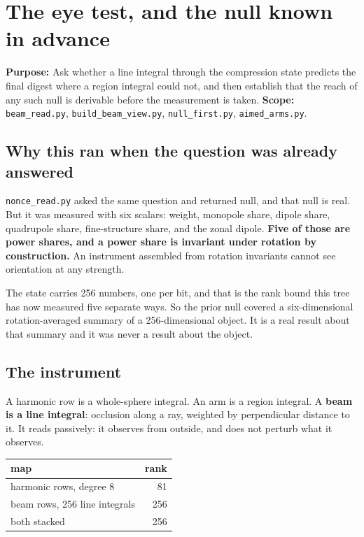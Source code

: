 
\chapter{The eye test, and the null known in advance}

\textbf{Purpose:} Ask whether a line integral through the compression state predicts the final
digest where a region integral could not, and then establish that the reach of any such null is
derivable before the measurement is taken. \textbf{Scope:} \texttt{beam\_read.py},
\texttt{build\_beam\_view.py}, \texttt{null\_first.py}, \texttt{aimed\_arms.py}.

\section{Why this ran when the question was already answered}

\texttt{nonce\_read.py} asked the same question and returned null, and that null is real. But it was
measured with six scalars: weight, monopole share, dipole share, quadrupole share, fine-structure
share, and the zonal dipole. \textbf{Five of those are power shares, and a power share is invariant
under rotation by construction.} An instrument assembled from rotation invariants cannot see
orientation at any strength.

The state carries 256 numbers, one per bit, and that is the rank bound this tree has now measured
five separate ways. So the prior null covered a six-dimensional rotation-averaged summary of a
256-dimensional object. It is a real result about that summary and it was never a result about the
object.

\section{The instrument}

A harmonic row is a whole-sphere integral. An arm is a region integral. A \textbf{beam is a line
integral}: occlusion along a ray, weighted by perpendicular distance to it. It reads passively:
it observes from outside, and does not perturb what it observes.

\begin{center}
\begin{tabular}{lr}
\toprule
map & rank \\
\midrule
harmonic rows, degree 8 & 81 \\
beam rows, 256 line integrals & 256 \\
both stacked & 256 \\
\bottomrule
\end{tabular}
\end{center}

